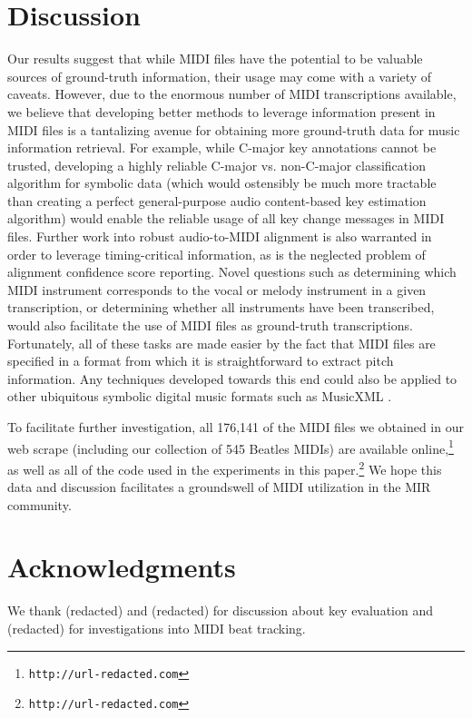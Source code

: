 \documentclass{article}
\begin{document}
\section{Discussion}
\label{sec:discussion}

Our results suggest that while MIDI files have the potential to be valuable sources of ground-truth information, their usage may come with a variety of caveats.
However, due to the enormous number of MIDI transcriptions available, we believe that developing better methods to leverage information present in MIDI files is a tantalizing avenue for obtaining more ground-truth data for music information retrieval.
For example, while C-major key annotations cannot be trusted, developing a highly reliable C-major vs. non-C-major classification algorithm for symbolic data (which would ostensibly be much more tractable than creating a perfect general-purpose audio content-based key estimation algorithm) would enable the reliable usage of all key change messages in MIDI files.
Further work into robust audio-to-MIDI alignment is also warranted in order to leverage timing-critical information, as is the neglected problem of alignment confidence score reporting.
Novel questions such as determining which MIDI instrument corresponds to the vocal or melody instrument in a given transcription, or determining whether all instruments have been transcribed, would also facilitate the use of MIDI files as ground-truth transcriptions.
Fortunately, all of these tasks are made easier by the fact that MIDI files are specified in a format from which it is straightforward to extract pitch information.
Any techniques developed towards this end could also be applied to other ubiquitous symbolic digital music formats such as MusicXML \cite{good2001musicxml}.

To facilitate further investigation, all 176,141 of the MIDI files we obtained in our web scrape (including our collection of 545 Beatles MIDIs) are available online,\footnote{\texttt{http://url-redacted.com}} as well as all of the code used in the experiments in this paper.\footnote{\texttt{http://url-redacted.com}}
We hope this data and discussion facilitates a groundswell of MIDI utilization in the MIR community.

\section{Acknowledgments}

We thank (redacted) %
and (redacted) %
for discussion about key evaluation and (redacted) %
for investigations into MIDI beat tracking.

\small

\end{document}
